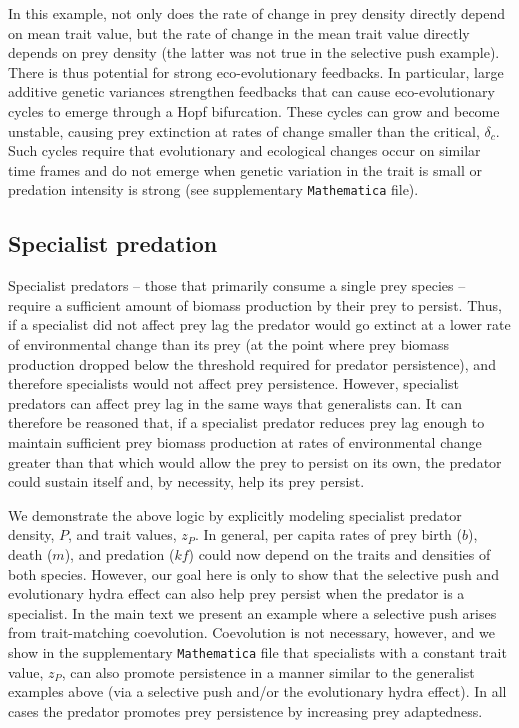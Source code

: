 \documentclass[11pt]{article}
\begin{document}
In this example, not only does the rate of change in prey density directly depend on mean trait value, but the rate of change in the mean trait value directly depends on prey density (the latter was not true in the selective push example).
There is thus potential for strong eco-evolutionary feedbacks.
In particular, large additive genetic variances strengthen feedbacks that can cause eco-evolutionary cycles to emerge through a Hopf bifurcation.
These cycles can grow and become unstable, causing prey extinction at rates of change smaller than the critical, $\delta_c$.
Such cycles require that evolutionary and ecological changes occur on similar time frames and do not  emerge when genetic variation in the trait is small or predation intensity is strong (see supplementary \texttt{Mathematica} file).

\subsection*{Specialist predation}

Specialist predators -- those that primarily consume a single prey species -- require a sufficient amount of biomass production by their prey to persist.
Thus, if a specialist did not affect prey lag the predator would go extinct at a lower rate of environmental change than its prey (at the point where prey biomass production dropped below the threshold required for predator persistence), and therefore specialists would not affect prey persistence.
However, specialist predators can affect prey lag in the same ways that generalists can. 
It can therefore be reasoned that, if a specialist predator reduces prey lag enough to maintain sufficient prey biomass production at rates of environmental change greater than that which would allow the prey to persist on its own, the predator could sustain itself and, by necessity, help its prey persist. 

We demonstrate the above logic by explicitly modeling specialist predator density, $P$, and trait values, $z_P$.
In general, per capita rates of prey birth ($b$), death ($m$), and predation ($kf$) could now depend on the traits and densities of both species.
However, our goal here is only to show that the selective push and evolutionary hydra effect can also help prey persist when the predator is a specialist.
In the main text we present an example where a selective push arises from trait-matching coevolution.
Coevolution is not necessary, however, and we show in the supplementary \texttt{Mathematica} file that specialists with a constant trait value, $z_P$, can also promote persistence in a manner similar to the generalist examples above (via a selective push and/or the evolutionary hydra effect).
In all cases the predator promotes prey persistence by increasing prey adaptedness.
\end{document}
